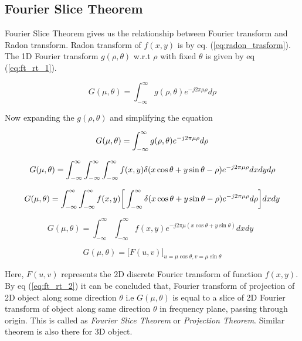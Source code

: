 \documentclass{report}
\begin{document}
\subsection{Fourier Slice Theorem} \label{sec:for_slice_theorem}
Fourier Slice Theorem gives us the relationship between Fourier transform and Radon transform. Radon transform of $f(x,y)$ is by eq. (\ref{eq:radon_trasform}). The 1D Fourier transform $g(\rho,\theta)$ w.r.t $\rho$ with fixed $\theta$ is given by eq (\ref{eq:ft_rt_1}).

\begin{equation}
G(\mu,\theta) = \int_{-\infty}^{\infty} g(\rho,\theta) e^{-j2\pi\mu\rho} d\rho
\label{eq:ft_rt_1}
\end{equation}

Now expanding the $g(\rho,\theta)$  and simplifying the equation

\begin{equation}
G(\mu,\theta) = \int_{-\infty}^{\infty} g(\rho,\theta) e^{-j2\pi\mu\rho} d\rho\\
\end{equation}

\begin{equation}
G(\mu,\theta) = \int_{-\infty}^{\infty} \int_{-\infty}^{\infty} \int_{-\infty}^{\infty} f(x,y)\delta(x\cos\theta+y\sin\theta - \rho)  e^{-j2\pi\mu\rho} dxdyd\rho \\
\end{equation}

\begin{equation}
G(\mu,\theta) = \int_{-\infty}^{\infty} \int_{-\infty}^{\infty} f(x,y) \bigg[ \int_{-\infty}^{\infty} \delta(x\cos\theta+y\sin\theta - \rho)  e^{-j2\pi\mu\rho} d\rho \bigg] dxdy \\
\end{equation}

\begin{equation}
G(\mu,\theta) = \int_{-\infty}^{\infty} \int_{-\infty}^{\infty} f(x,y) e^{-j2\pi\mu(x\cos\theta+y\sin\theta)} dxdy \enspace
\end{equation}


\begin{equation}\label{eq:ft_rt_2}
G(\mu,\theta) = \big[F(u,v)\big]_{u=\mu\cos\theta,v=\mu\sin\theta}
\end{equation}

\noindent
Here, $F(u,v)$ represents the 2D discrete Fourier transform of function $f(x,y)$. By eq (\ref{eq:ft_rt_2}) it can be concluded that, Fourier transform of projection of 2D object along some direction $\theta$ i.e $G(\mu,\theta)$ is equal to a slice of 2D Fourier transform of object along same direction $\theta$ in frequency plane, passing through origin. This is called as \textit{Fourier Slice Theorem} or \textit{Projection Theorem}. Similar theorem is also there for 3D object.
\end{document}
